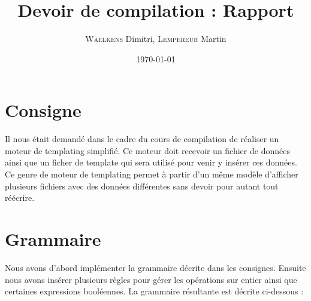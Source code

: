 \documentclass[report,10pt,a4paper]{memoir}
\author{\textsc{Waelkens} Dimitri, \textsc{Lempereur} Martin}
\title{Devoir de compilation : Rapport}
\date{\today}
\begin{document}
\maketitle
\newpage

\section*{Consigne}
Il nous était demandé dans le cadre du cours de compilation de réaliser un moteur de templating simplifié.
Ce moteur doit recevoir un fichier de données ainsi que un ficher de template qui sera utilisé pour venir y insérer ces données.
Ce genre de moteur de templating permet à partir d'un même modèle d'afficher plusieurs fichiers avec des données différentes sans devoir pour autant tout réécrire.
\section*{Grammaire}
Nous avons d'abord implémenter la grammaire décrite dans les consignes.
Ensuite nous avons insérer plusieurs règles pour gérer les opérations sur entier ainsi que certaines expressions booléennes.
La grammaire résultante est décrite ci-dessous :\\
\end{document}
